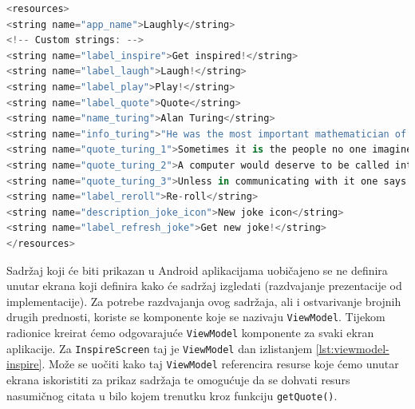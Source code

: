 \documentclass[11pt,a4paper,twoside]{article}
\begin{document}
\begin{lstlisting}[caption={Resursi - values/strings.xml}, label={lst:resources-strings}, language=Kotlin]
<resources>
<string name="app_name">Laughly</string>
<!-- Custom strings: -->
<string name="label_inspire">Get inspired!</string>
<string name="label_laugh">Laugh!</string>
<string name="label_play">Play!</string>
<string name="label_quote">Quote</string>
<string name="name_turing">Alan Turing</string>
<string name="info_turing">"He was the most important mathematician of the second world war. He helped to break the German's Enigma code at Blatchley Park, by designing a computer to decipher the German messages called the Bombe. The most important effects of this revolutionary invention were:\n - Shortening the length of the war: by decoding the German's messages Blatchley Park's team was able to identify the position of all Nazi's boats so the Royal Navy was able to protect English naval fleet from u-boats's attacks.\n - Saving millions lives: the avoided attacks permit a lot of people to stay in life. Turing's team, on the other hand, had to avoid that German discover that  Enigma had been decrypted. An electromechanical device that helped the code-breakers to calculate the key of the day the German were using on their Enigma machine.Using a menu provided by the codebreaking team from a crib (plaintext that corresponded to ciphertext), the Bombe operators could quickly set up the machine and let it calculate possible Enigma settings.\n  After the war Alan Turing came up with Turing Test, a method to test artificial intelligence.Persecuted for homosexual acts, he committed suicide in 1954.\n"</string>
<string name="quote_turing_1">Sometimes it is the people no one imagines anything of who do the things that no one can imagine.</string>
<string name="quote_turing_2">A computer would deserve to be called intelligent if it could deceive a human into believing that it was human.</string>
<string name="quote_turing_3">Unless in communicating with it one says exactly what one means, trouble is bound to result.</string>
<string name="label_reroll">Re-roll</string>
<string name="description_joke_icon">New joke icon</string>
<string name="label_refresh_joke">Get new joke!</string>
</resources>
\end{lstlisting}

Sadržaj koji će biti prikazan u Android aplikacijama uobičajeno se ne definira unutar ekrana koji definira kako će sadržaj izgledati (razdvajanje prezentacije od implementacije). Za potrebe razdvajanja ovog sadržaja, ali i ostvarivanje brojnih drugih prednosti, koriste se komponente koje se nazivaju \texttt{ViewModel}. Tijekom radionice kreirat ćemo odgovarajuće \texttt{ViewModel} komponente za svaki ekran aplikacije. Za \texttt{InspireScreen} taj je \texttt{ViewModel} dan izlistanjem \ref{lst:viewmodel-inspire}. Može se uočiti kako taj \texttt{ViewModel} referencira resurse koje ćemo unutar ekrana iskoristiti za prikaz sadržaja te omogućuje da se dohvati resurs nasumičnog citata u bilo kojem trenutku kroz funkciju \texttt{getQuote()}.
\end{document}
